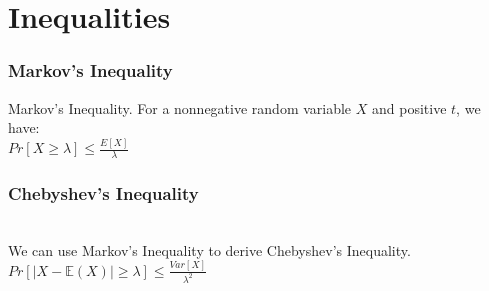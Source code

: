 \section{Inequalities}

\subsubsection{Markov's Inequality}

Markov's Inequality. For a nonnegative random variable $X$ and positive $t$, we have:\\

$Pr[ X \geq \lambda ] \leq \frac{E[X]}{\lambda}$\\

\subsubsection{Chebyshev's Inequality}\\

We can use Markov's Inequality to derive Chebyshev's Inequality. \\

$Pr[ |X-\mathbb{E}(X)| \geq \lambda ] \leq \frac{ Var[X] }{\lambda^2}$\\

